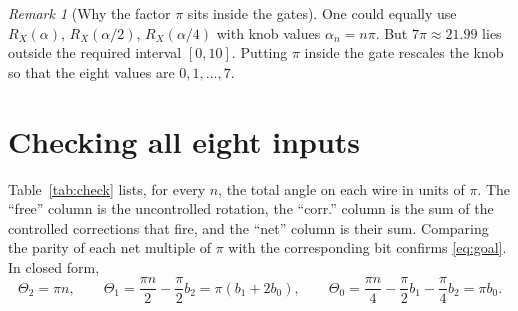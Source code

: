 \documentclass[11pt,a4paper]{article}
\newcommand{\RX}{R_X}
\theoremstyle{plain}
\theoremstyle{definition}
\theoremstyle{remark}
\newtheorem{remark}[lemma]{Remark}
\begin{document}
\begin{remark}[Why the factor $\pi$ sits inside the gates]
One could equally use $\RX(\alpha)$, $\RX(\alpha/2)$, $\RX(\alpha/4)$ with knob values
$\alpha_n = n\pi$. But $7\pi \approx 21.99$ lies outside the required interval $[0,10]$. Putting
$\pi$ inside the gate rescales the knob so that the eight values are $0,1,\dots,7$.
\end{remark}

\section{Checking all eight inputs}\label{sec:check}

Table~\ref{tab:check} lists, for every $n$, the total angle on each wire in units of $\pi$. The
``free'' column is the uncontrolled rotation, the ``corr.'' column is the sum of the controlled
corrections that fire, and the ``net'' column is their sum. Comparing the parity of each net
multiple of $\pi$ with the corresponding bit confirms \eqref{eq:goal}. In closed form,
\[
\Theta_2 = \pi n, \qquad
\Theta_1 = \frac{\pi n}{2} - \frac{\pi}{2}b_2 = \pi(b_1 + 2b_0), \qquad
\Theta_0 = \frac{\pi n}{4} - \frac{\pi}{2}b_1 - \frac{\pi}{4}b_2 = \pi b_0 .
\]
\end{document}

